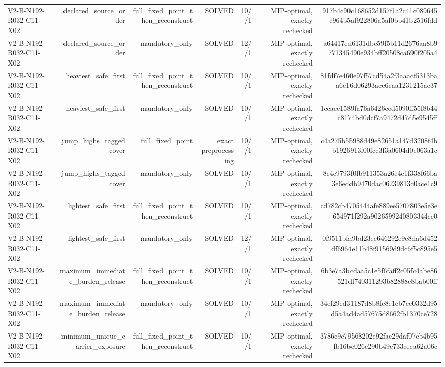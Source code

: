 {\begin{longtable}{lrrrrrr}
V2-B-N192-R032-C11-X02 & declared\_source\_order & full\_fixed\_point\_then\_reconstruct & SOLVED & 10//1 & MIP-optimal, exactly rechecked & 917b4c90c168652d157f1a2c41c089645c964b5af922806a5af0bb41b2516fdd \\
V2-B-N192-R032-C11-X02 & declared\_source\_order & mandatory\_only & SOLVED & 12//1 & MIP-optimal, exactly rechecked & a64417ed6131dbc59f5b11d2676aa8b9771345490e934bff20508ca690f205a4 \\
V2-B-N192-R032-C11-X02 & heaviest\_safe\_first & full\_fixed\_point\_then\_reconstruct & SOLVED & 10//1 & MIP-optimal, exactly rechecked & 81fdf7e460e97f57cd54a2f3aaacf5313baa6e16d06293ace6caa1231215ac37 \\
V2-B-N192-R032-C11-X02 & heaviest\_safe\_first & mandatory\_only & SOLVED & 10//1 & MIP-optimal, exactly rechecked & 1ccacc1589fa76a6426ced5090ff55f8b44c8174bd0dcf7a9472d47d5e9545ff \\
V2-B-N192-R032-C11-X02 & jump\_highs\_tagged\_cover & full\_fixed\_point & exact preprocessing & 10//1 & MIP-optimal, exactly rechecked & c4a275b55988d49e82651a147d3208f4bb1926913f00fcc3f3a0604d0e063a1c \\
V2-B-N192-R032-C11-X02 & jump\_highs\_tagged\_cover & mandatory\_only & SOLVED & 10//1 & MIP-optimal, exactly rechecked & 8c4c9793f0fb911353a26e4e1f338f66ba3e6eddb9470dac06239813c0ace1c9 \\
V2-B-N192-R032-C11-X02 & lightest\_safe\_first & full\_fixed\_point\_then\_reconstruct & SOLVED & 10//1 & MIP-optimal, exactly rechecked & cd782cb4705444afe889ee5707803e5e3e654971f292a9026599240803344ce0 \\
V2-B-N192-R032-C11-X02 & lightest\_safe\_first & mandatory\_only & SOLVED & 12//1 & MIP-optimal, exactly rechecked & 0f9511bfa9bd23ee646292e9e8da6d452df6964e11b48f91569d9dc6f5c895e5 \\
V2-B-N192-R032-C11-X02 & maximum\_immediate\_burden\_release & full\_fixed\_point\_then\_reconstruct & SOLVED & 10//1 & MIP-optimal, exactly rechecked & 6b3e7a3bcdaa5c1e5f6faff2c05fc4abe86521df740311293b82888c8bab00ff \\
V2-B-N192-R032-C11-X02 & maximum\_immediate\_burden\_release & mandatory\_only & SOLVED & 10//1 & MIP-optimal, exactly rechecked & 34ef29ed31187d8b8fc8e1eb7ce0332d95d5a4ad4ad57675d8662fb1370ce728 \\
V2-B-N192-R032-C11-X02 & minimum\_unique\_carrier\_exposure & full\_fixed\_point\_then\_reconstruct & SOLVED & 10//1 & MIP-optimal, exactly rechecked & 3786c9c79568202e92fae29daf07cb4b95fb16be026e290b49e733ceca62a06c \\

\end{longtable}}
